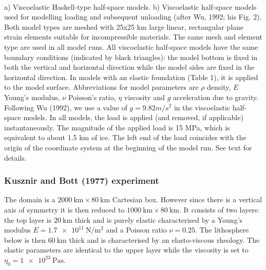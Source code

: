 \begin{center}
\\
{\captionfont 
a) Viscoelastic Haskell-type half-space models. b) Viscoelastic  half-space models used for modelling loading and subsequent
unloading (after Wu, 1992; his Fig. 2). Both model types are meshed with 25x25 km large linear, rectangular plane strain elements suitable for incompressible materials. 
The same mesh and element type are used in all model runs. All viscoelastic half-space models have the same boundary conditions (indicated by black triangles): the model bottom is fixed in both the vertical and horizontal direction while the model sides are fixed in the horizontal direction. In models with an elastic foundation (Table 1), it is applied to the model surface. Abbreviations for model parameters are $\rho$ density, $E$ Young's modulus, $\nu$ Poisson's ratio, $\eta$ viscosity and $g$ acceleration due to gravity. Following Wu (1992), we use a value of $g = 9.82 m/s^2$ in the viscoelastic
half-space models. 
In all models, the load is applied (and removed, if applicable) instantaneously. The magnitude of the applied load is 15 MPa, which is equivalent to about 1.5 km of ice. The left end of
the load coincides with the origin of the coordinate system at the beginning of the model run. See text for details.
}
\end{center}


\subsubsection{Kusznir and Bott (1977) experiment}

The domain is a $\SI{2000}{\km}\times\SI{80}{\km}$ Cartesian box. 
However since there is a vertical axis of symmetry it is then reduced to 
$\SI{1000}{\km}\times\SI{80}{\km}$.
It consists of two layers: the top layer is $\SI{20}{\km}$ thick and is 
purely elastic characterised by a Young's modulus $E=\SI{1.7e11}{\newton\per\square\meter}$ and a Poisson ratio $\nu=0.25$.
The lithosphere below is then $\SI{60}{\km}$ thick and is characterised by an elasto-viscous rheology. The elastic parameters are identical to the upper layer while the viscosity is set to $\eta_0=\SI{1e23}{\pascal\second}$.

